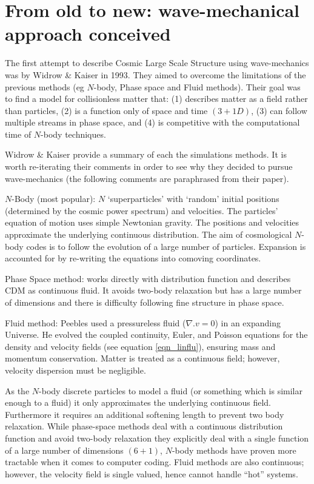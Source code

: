 \section{From old to new: wave-mechanical approach conceived}
\label{lsswm_con}
The first attempt to describe Cosmic Large Scale Structure using wave-mechanics was by Widrow \& Kaiser \citep{bib_wk} in 1993. They aimed
to overcome the limitations of the previous methods (eg $N$-body, Phase space and Fluid methods). Their goal was to find a model for collisionless
matter that: (1) describes matter as a field rather than particles, (2) is a function only of space and time $(3+1D)$, (3) can follow multiple streams in phase space, and (4) is competitive with the computational time of $N$-body techniques.

Widrow \& Kaiser \citep{bib_wk} provide a summary of each the simulations methods. It is worth re-iterating their comments in order to see why they decided to pursue wave-mechanics (the following comments are paraphrased from their paper).
\newline

$N$-Body (most popular): $N$ `superparticles' with `random' initial positions (determined by the cosmic power spectrum) and velocities. The particles' equation of motion uses simple Newtonian gravity. The positions and velocities approximate the underlying continuous distribution. The aim of cosmological $N$-body codes is to follow the evolution of a large number of particles. Expansion is accounted for by re-writing the equations into comoving coordinates.
\newline

Phase Space method: works directly with distribution function and describes CDM as continuous fluid. It avoids two-body relaxation but has a large number of dimensions and there is difficulty following fine structure in phase space.
\newline

Fluid method: Peebles \citep{bib_peeb2} used a pressureless fluid ($\nabla . v = 0$) in an expanding Universe. He evolved the coupled continuity, Euler, and Poisson equations for the density and velocity fields (see equation \ref{eqn_linflu}), ensuring mass and momentum conservation. Matter is treated as a continuous field; however, velocity dispersion must be negligible.
\newline

As the $N$-body discrete particles to model a fluid (or something which is similar enough to a fluid) it only approximates the underlying continuous field. Furthermore it requires an additional softening length to prevent two body relaxation. While phase-space methods deal with a continuous distribution function and avoid two-body relaxation they explicitly deal with a single function of a large number of dimensions $(6+1)$, $N$-body methods have proven more tractable when it comes to computer coding. Fluid methods are also continuous; however, the velocity field is single valued, hence cannot handle ``hot'' systems.

